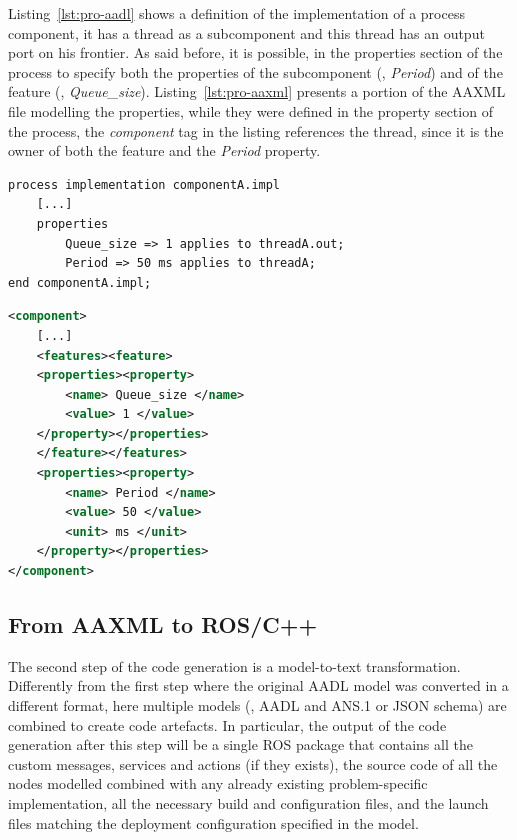 Listing~\ref{lst:pro-aadl} shows a definition of the implementation of a process component, it has a thread as a subcomponent and this thread has an output port on his frontier. As said before, it is possible, in the properties section of the process to specify both the properties of the subcomponent (\ie, \textit{Period}) and of the feature (\ie, \textit{Queue\_size}). Listing~\ref{lst:pro-aaxml} presents a portion of the AAXML file modelling the properties, while they were defined in the property section of the process, the \textit{component} tag in the listing references the thread, since it is the owner of both the feature and the \textit{Period} property. 

\begin{lstlisting}[language=AADL,caption={Minimal AADL model containing properties},label=lst:pro-aadl]
process implementation componentA.impl
	[...]
	properties
		Queue_size => 1 applies to threadA.out;
		Period => 50 ms applies to threadA;
end componentA.impl;
\end{lstlisting}

\begin{lstlisting}[language=XML,caption={AAXML description of AADL properties},label=lst:pro-aaxml]
<component>
	[...]
	<features><feature>
	<properties><property>
		<name> Queue_size </name>
		<value> 1 </value>
	</property></properties>
	</feature></features>
	<properties><property>
		<name> Period </name>
		<value> 50 </value>
		<unit> ms </unit>
	</property></properties>
</component>
\end{lstlisting}

\subsection{From AAXML to ROS/C++}
\label{sec:xml-cpp}
The second step of the code generation is a model-to-text transformation. Differently from the first step where the original AADL model was converted in a different format, here multiple models (\ie, AADL and ANS.1 or JSON schema) are combined to create code artefacts. In particular, the output of the code generation after this step will be a single ROS package that contains all the custom messages, services and actions (if they exists), the source code of all the nodes modelled combined with any already existing problem-specific implementation, all the necessary build and configuration files, and the launch files matching the deployment configuration specified in the model.

